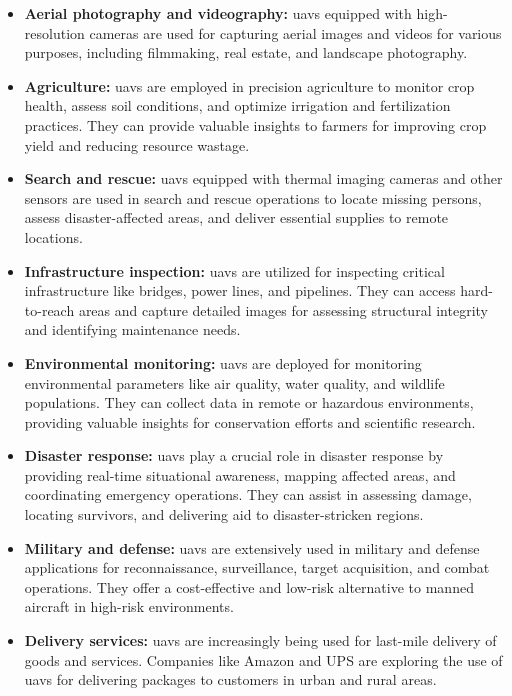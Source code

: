 \begin{itemize}
  \item \textbf{Aerial photography and videography:} \glspl{uav} equipped with high-resolution cameras are used for capturing aerial images and videos for various purposes, including filmmaking, real estate, and landscape photography.

  \item \textbf{Agriculture:} \glspl{uav} are employed in precision agriculture to monitor crop health, assess soil conditions, and optimize irrigation and fertilization practices. They can provide valuable insights to farmers for improving crop yield and reducing resource wastage.

  \item \textbf{Search and rescue:} \glspl{uav} equipped with thermal imaging cameras and other sensors are used in search and rescue operations to locate missing persons, assess disaster-affected areas, and deliver essential supplies to remote locations.

  \item \textbf{Infrastructure inspection:} \glspl{uav} are utilized for inspecting critical infrastructure like bridges, power lines, and pipelines. They can access hard-to-reach areas and capture detailed images for assessing structural integrity and identifying maintenance needs.

  \item \textbf{Environmental monitoring:} \glspl{uav} are deployed for monitoring environmental parameters like air quality, water quality, and wildlife populations. They can collect data in remote or hazardous environments, providing valuable insights for conservation efforts and scientific research.

  \item \textbf{Disaster response:} \glspl{uav} play a crucial role in disaster response by providing real-time situational awareness, mapping affected areas, and coordinating emergency operations. They can assist in assessing damage, locating survivors, and delivering aid to disaster-stricken regions.

  \item \textbf{Military and defense:} \glspl{uav} are extensively used in military and defense applications for reconnaissance, surveillance, target acquisition, and combat operations. They offer a cost-effective and low-risk alternative to manned aircraft in high-risk environments.

    \item \textbf{Delivery services:} \glspl{uav} are increasingly being used for last-mile delivery of goods and services. Companies like Amazon and UPS are exploring the use of \glspl{uav} for delivering packages to customers in urban and rural areas.
\end{itemize}

